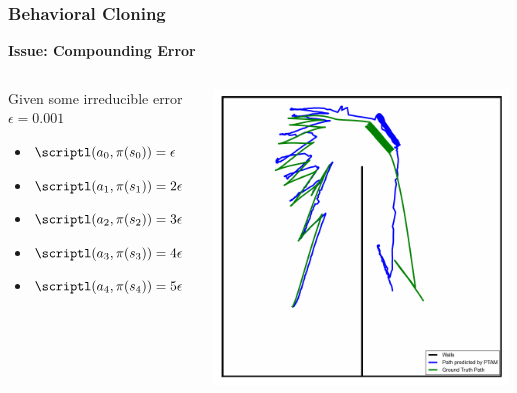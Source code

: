\begin{frame}
	\frametitle{Behavioral Cloning}
		\textbf{Issue: Compounding Error}
		\begin{columns}
			\begin{column}{0.5\textwidth}
			Given some irreducible error $\epsilon =0.001$
				\begin{itemize}
					\item $\scriptl(a_0, \pi(s_0)) = \epsilon$
					\item $\scriptl(a_1, \pi(s_1)) = 2\epsilon$
					\item $\scriptl(a_2, \pi(s_2)) = 3\epsilon$
					\item $\scriptl(a_3, \pi(s_3)) = 4\epsilon$
					\item $\scriptl(a_4, \pi(s_4)) = 5\epsilon$
				\end{itemize}
			\end{column}
			\begin{column}{0.5\textwidth}
				\includegraphics[width=0.99\textwidth]{bh1.png}
			\end{column}
		\end{columns}
\end{frame}